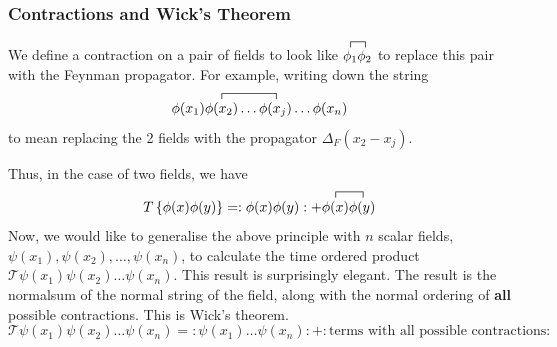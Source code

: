 \documentclass[11pt, oneside]{article}   	%
\theoremstyle{newline}
\theoremstyle{newline}
\theoremstyle{newline}
\theoremstyle{newline}
\theoremstyle{newline}
\begin{document}
\pagebreak 
\subsubsection{Contractions and Wick's Theorem}  
We define a contraction on a pair of fields to look like $ \contraction{}{ \phi_1 } { } { \phi _ 2 } \phi_1 \phi_2  $
to replace this pair with the Feynman propagator. 
For example, writing down the string 
\[
 \contraction{\phi( x_1 ) }{ \phi( x_2) }{ \dots }{ \phi ( x_{ j } )  } \phi( x_1 ) \phi ( x_2 ) \dots \phi ( x_{j } ) \dots \phi ( x_{ n }) 
\] to mean replacing the 2 fields with the propagator $ \Delta_F ( x_2 - x_{ j } ) $. 

Thus, in the case of two fields, we have
\[
T \left\{ \phi ( x) \phi ( y )  \right\} = : \phi ( x) \phi ( y ) : + \contraction{}{\phi ( x) } { } { \phi ( y ) }{ } \phi ( x) \phi ( y ) 
\]
Now, we would like to generalise the above principle with $n$ scalar fields, $\psi(x_1),  \psi(x_2), \dots, \psi(x_n) $, to calculate the time ordered product $ \mathcal{T} \psi(x_1) \psi(x_2) \dots \psi(x_n) $. This result is surprisingly elegant. The result is the normalsum of the normal string of the field, along with the normal ordering of \textbf{all} possible contractions. This is Wick's theorem.
\[ 
\mathcal{T} \psi(x_1) \psi(x_2) \dots \psi(x_n) = :\psi(x_1) \dots \psi(x_n): + : \text{terms with all possible contractions}: \] 
\end{document}
